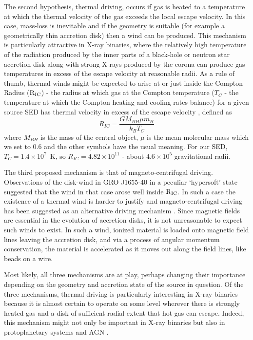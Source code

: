 \documentclass[a4paper,fleqn,usenatbib]{mnras}
\begin{document}
The second hypothesis, thermal driving, occurs if gas is heated to a temperature at which the thermal velocity of 
the gas exceeds
the local escape velocity. In this case, mass-loss is inevitable and if the geometry is suitable (for example a
geometrically thin accretion disk) then a wind can be produced. This mechanism is particularly attractive in 
X-ray binaries, where the relatively high temperature of the radiation produced by the inner parts of a black-hole or 
neutron star accretion disk along with strong X-rays produced by the corona can produce gas temperatures in excess
of the escape velocity at reasonable radii. As a rule of thumb, thermal winds might be expected
to arise at or just inside the Compton Radius ($\rm{R_{IC}}$) - the radius at which gas at the Compton temperature ($T_C$ - 
the temperature at which the Compton heating and cooling rates balance)
for a given source SED has thermal velocity in excess of the escape velocity \citep{1983ApJ...271...70B}, defined as
\begin{equation}
R_{IC}=\frac{GM_{BH}\mu m_H}{k_BT_C}
\end{equation}
where $M_{BH}$ is the mass of the central object, $\mu$ is the 
mean molecular mass which we set to 0.6 and the other symbols have the usual meaning. 
For our SED, $T_C=1.4\times10^7$~K, so $R_{IC}=4.82\times10^{11}$ - about $4.6\times10^5$ gravitational
radii.


 The third proposed mechanism is that of magneto-centrifugal driving. 
Observations of the disk-wind in GRO J1655-40 in a peculiar `hypersoft' state suggested that the wind in that
case arose well inside $\rm{R_{IC}}$. In such a case the existence of a thermal wind is harder to justify 
and magneto-centrifugal driving has been suggested as an alternative driving mechanism
\citep[but also see \citealt{2006ApJ...652L.117N,2015MNRAS.451..475U,2016ApJ...823..159S}]
{1992ApJS...80..753S,2006Natur.441..953M,2008ApJ...680.1359M,2009ApJ...701..865K}. Since
magnetic fields are essential in the evolution of accretion disks, it is not unreasonable to expect such winds to 
exist. In such a wind, ionized material is loaded onto magnetic field lines leaving the accretion disk, and via a process
of angular momentum conservation, the material is accelerated as it moves out along the field lines, like beads
on a wire.

Most likely, all three mechanisms are at play, perhaps changing their importance depending on the
geometry and accretion state of the source in question. Of the three mechanisms, thermal driving is 
particularly interesting in X-ray binaries because it is almost certain to 
operate on some level wherever there is strongly heated gas and a disk of sufficient radial extent that hot gas 
can escape. Indeed, this mechanism might not only be important in X-ray binaries but also in protoplanetary systems \cite[e.g.][]{2012MNRAS.422.1880O} and AGN \cite[e.g.][]{2018MNRAS.476.4395B}.
\end{document}
